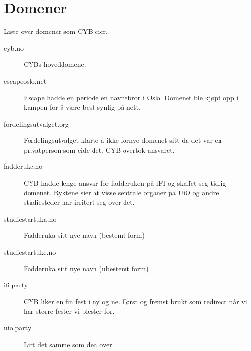 \chapter*{Domener}

Liste over domener som CYB eier.

\begin{description}
	\item[cyb.no] CYBs hoveddomene. 
	\item[escapeoslo.net] Escape hadde en periode en navnebror i Oslo. Domenet ble kjøpt opp i kampen for å være best synlig på nett.
	\item[fordelingsutvalget.org] Fordelingsutvalget klarte å ikke fornye domenet sitt da det var en privatperson som eide det. CYB overtok ansvaret.
	\item[fadderuke.no] CYB hadde lenge ansvar for fadderuken på IFI og skaffet seg tidlig domenet. Ryktene sier at visse sentrale organer på UiO og andre studiesteder har irritert seg over det.
	\item[studiestartuka.no] Fadderuka sitt nye navn (bestemt form)
	\item[studiestartuke.no] Fadderuka sitt nye navn (ubestemt form)
	\item[ifi.party] CYB liker en fin fest i ny og ne. Først og fremst brukt som redirect når vi har større fester vi blester for.
	\item[uio.party] Litt det samme som den over.
\end{description}
